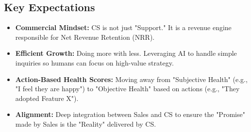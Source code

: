 \documentclass[12pt,a4paper]{article}
\begin{document}
\subsection{Key Expectations}
\begin{itemize}
    \item \textbf{Commercial Mindset:} CS is not just "Support." It is a revenue engine responsible for Net Revenue Retention (NRR).
    \item \textbf{Efficient Growth:} Doing more with less. Leveraging AI to handle simple inquiries so humans can focus on high-value strategy.
    \item \textbf{Action-Based Health Scores:} Moving away from "Subjective Health" (e.g., "I feel they are happy") to "Objective Health" based on actions (e.g., "They adopted Feature X").
    \item \textbf{Alignment:} Deep integration between Sales and CS to ensure the "Promise" made by Sales is the "Reality" delivered by CS.
\end{itemize}
\end{document}
